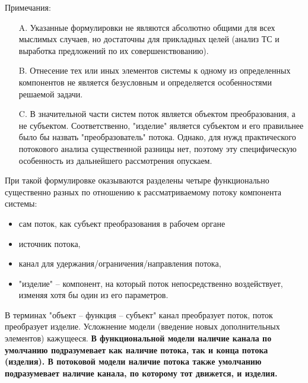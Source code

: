 \documentclass[a4paper,11pt]{article}
\begin{document}
Примечания:
\begin{itemize}
\item[A.] Указанные формулировки не являются абсолютно общими для всех
  мыслимых случаев, но достаточны для прикладных целей (анализ ТС и выработка
  предложений по их совершенствованию).
\item[B.] Отнесение тех или иных элементов системы к одному из определенных
  компонентов не является безусловным и определяется особенностями решаемой
  задачи.
\item[C.] В значительной части систем поток является объектом преобразования,
  а не субъектом. Соответственно, "изделие" является субъектом и его
  правильнее было бы назвать "преобразователь" потока. Однако, для нужд
  практического потокового анализа существенной разницы нет, поэтому эту
  специфическую особенность из дальнейшего рассмотрения опускаем.
\end{itemize}
При такой формулировке оказываются разделены четыре функционально существенно
разных по отношению к рассматриваемому потоку компонента системы:
\begin{itemize}
\item сам поток, как субъект преобразования в рабочем органе
\item источник потока,
\item канал для удержания/ограничения/направления потока,
\item "изделие" {--} компонент, на который поток непосредственно воздействует,
  изменяя хотя бы один из его параметров.
\end{itemize}
В терминах "объект -- функция -- субъект" канал преобразует поток, поток
преобразует изделие. Усложнение модели (введение новых дополнительных
элементов) кажущееся. \textbf{В функциональной модели наличие канала по
  умолчанию подразумевает как наличие потока, так и конца потока (изделия). В
  потоковой модели наличие потока также умолчанию подразумевает наличие
  канала, по которому тот движется, и изделия.}
\end{document}
